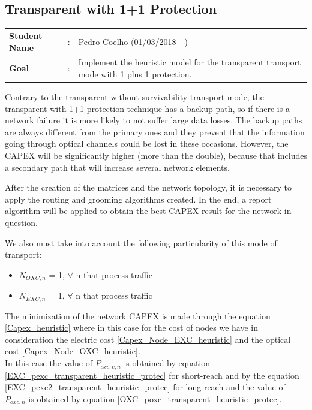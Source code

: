 \clearpage
\subsection{Transparent with 1+1 Protection}\label{heuristic_Transp_Protection}
\begin{tcolorbox}	
\begin{tabular}{p{2.75cm} p{0.2cm} p{10.5cm}} 	
\textbf{Student Name}  &:& Pedro Coelho    (01/03/2018 - )\\
\textbf{Goal}          &:& Implement the heuristic model for the transparent transport mode with 1 plus 1 protection.
\end{tabular}
\end{tcolorbox}

\vspace{11pt}
Contrary to the transparent without survivability transport mode, the transparent with 1+1 protection technique has a backup path, so if there is a network failure it is more likely to not suffer large data losses. The backup paths are always different from the primary ones and they prevent that the information going through optical channels could be lost in these occasions. However, the CAPEX will be significantly higher (more than the double), because that includes a secondary path that will increase several network elements.

After the creation of the matrices and the network topology, it is necessary to apply the routing and grooming algorithms created. In the end, a report algorithm will be applied to obtain the best CAPEX result for the network in question.

We also must take into account the following particularity of this mode of transport:
\begin{itemize}
  \item $N_{OXC,n}$ = 1, \quad $\forall$ n that process traffic
  \item $N_{EXC,n}$ = 1, \quad $\forall$ n that process traffic
\end{itemize}

\vspace{11pt}
The minimization of the network CAPEX is made through the equation \ref{Capex_heuristic} where in this case for the cost of nodes we have in consideration the electric cost \ref{Capex_Node_EXC_heuristic} and the optical cost \ref{Capex_Node_OXC_heuristic}.\\

In this case the value of $P_{exc,c,n}$ is obtained by equation \ref{EXC_pexc_transparent_heuristic_protec} for short-reach and by the equation \ref{EXC_pexc2_transparent_heuristic_protec} for long-reach and the value of $P_{oxc,n}$ is obtained by equation \ref{OXC_poxc_transparent_heuristic_protec}.\\

